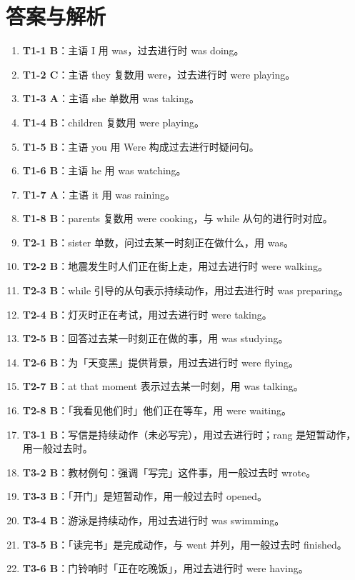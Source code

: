 \documentclass[11pt,a4paper]{ctexart}
\begin{document}
\section*{答案与解析}
\small
\begin{enumerate}[leftmargin=1.6em,itemsep=2pt]
\item \textbf{T1-1 B}：主语 I 用 was，过去进行时 was doing。
\item \textbf{T1-2 C}：主语 they 复数用 were，过去进行时 were playing。
\item \textbf{T1-3 A}：主语 she 单数用 was taking。
\item \textbf{T1-4 B}：children 复数用 were playing。
\item \textbf{T1-5 B}：主语 you 用 Were 构成过去进行时疑问句。
\item \textbf{T1-6 B}：主语 he 用 was watching。
\item \textbf{T1-7 A}：主语 it 用 was raining。
\item \textbf{T1-8 B}：parents 复数用 were cooking，与 while 从句的进行时对应。
\item \textbf{T2-1 B}：sister 单数，问过去某一时刻正在做什么，用 was。
\item \textbf{T2-2 B}：地震发生时人们正在街上走，用过去进行时 were walking。
\item \textbf{T2-3 B}：while 引导的从句表示持续动作，用过去进行时 was preparing。
\item \textbf{T2-4 B}：灯灭时正在考试，用过去进行时 were taking。
\item \textbf{T2-5 B}：回答过去某一时刻正在做的事，用 was studying。
\item \textbf{T2-6 B}：为「天变黑」提供背景，用过去进行时 were flying。
\item \textbf{T2-7 B}：at that moment 表示过去某一时刻，用 was talking。
\item \textbf{T2-8 B}：「我看见他们时」他们正在等车，用 were waiting。
\item \textbf{T3-1 B}：写信是持续动作（未必写完），用过去进行时；rang 是短暂动作，用一般过去时。
\item \textbf{T3-2 B}：教材例句：强调「写完」这件事，用一般过去时 wrote。
\item \textbf{T3-3 B}：「开门」是短暂动作，用一般过去时 opened。
\item \textbf{T3-4 B}：游泳是持续动作，用过去进行时 was swimming。
\item \textbf{T3-5 B}：「读完书」是完成动作，与 went 并列，用一般过去时 finished。
\item \textbf{T3-6 B}：门铃响时「正在吃晚饭」，用过去进行时 were having。

\end{enumerate}
\end{document}
